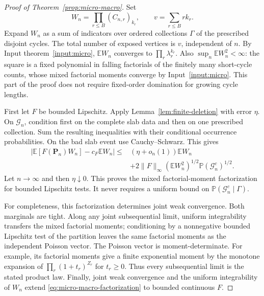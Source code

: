 \documentclass[11pt]{article}
\numberwithin{equation}{section}
\newcommand{\E}{\mathbb E}
\newcommand{\Pp}{\mathbb P}
\theoremstyle{definition}
\theoremstyle{remark}
\begin{document}
\begin{proof}[Proof of Theorem~\ref{prop:micro-macro}]
Set
\[
 W_n=\prod_{r\le B}(C_{n,r})_{k_r},\qquad
 v=\sum_{r\le B}rk_r.
\]
Expand $W_n$ as a sum of indicators over ordered collections $\Gamma$ of
the prescribed disjoint cycles.  The total number of exposed vertices is
$v$, independent of $n$.  By Input theorem~\ref{input:micro}, $\E W_n$ converges to
$\prod_r\lambda_r^{k_r}$.  Also $\sup_n\E W_n^2<\infty$: the square is a fixed polynomial in
falling factorials of the finitely many short-cycle counts, whose mixed
factorial moments converge by Input~\ref{input:micro}.  This part of the
proof does not require fixed-order domination for growing cycle lengths.

First let $F$ be bounded Lipschitz.  Apply
Lemma~\ref{lem:finite-deletion} with error $\eta$.
On $\mathcal G_n$, condition first on the complete slab data and then on
one prescribed collection.  Sum the resulting inequalities with their
conditional occurrence probabilities.  On the bad slab event use
Cauchy--Schwarz.  This gives
\begin{equation}\label{eq:weighted-good-slab}
\begin{split}
 |\E[F(\mathbf P_n)W_n]-c_F\E W_n|
 \le{}&(\eta+o_n(1))\E W_n\\
 &+2\|F\|_\infty(\E W_n^2)^{1/2}
                         \Pp(\mathcal G_n^c)^{1/2}.
\end{split}
\end{equation}
Let $n\to\infty$ and then $\eta\downarrow0$.  This proves the mixed
factorial-moment factorization for bounded Lipschitz tests.  It never
requires a uniform bound on $\Pp(\mathcal G_n^c\mid\Gamma)$.

For completeness, this factorization determines joint weak convergence.
Both marginals are tight.  Along any joint subsequential limit, uniform
integrability transfers the mixed factorial moments; conditioning by a
nonnegative bounded Lipschitz test of the partition leaves the same
factorial moments as the independent Poisson vector.  The Poisson vector
is moment-determinate.  For example, its factorial moments give a finite
exponential moment by the monotone expansion of
$\prod_r(1+t_r)^{Z_r}$ for $t_r\ge0$.
Thus every subsequential limit is the stated product law.
Finally, joint weak convergence and the uniform integrability of $W_n$
extend \eqref{eq:micro-macro-factorization} to bounded continuous $F$.
\end{proof}
\end{document}
